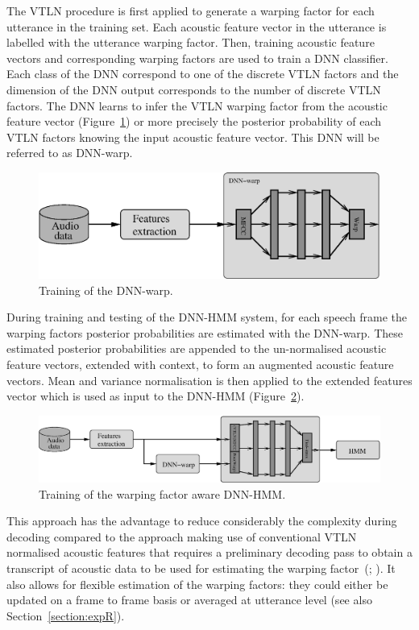 \documentclass{nle}
\begin{document}
The VTLN procedure is first applied to generate a warping factor for
each  utterance in the  training set. Each acoustic feature vector in the utterance is labelled with the utterance warping factor. Then, training acoustic feature vectors and corresponding warping factors are used to train a DNN classifier. Each class of the DNN correspond to one of the discrete VTLN factors and the dimension of the DNN output corresponds to the number of discrete VTLN factors. The DNN learns to infer the VTLN warping factor from the acoustic feature vector (Figure~\ref{fig1}) or more precisely the posterior probability of each VTLN factors knowing the input acoustic feature vector. This DNN will be referred to as DNN-warp.
\begin{figure}
       \includegraphics[width=\textwidth]{fig1}
        \caption{Training of the DNN-warp.} 
   	\label{fig1}
\end{figure}


During training  and testing  of the DNN-HMM  system, for  each speech
frame the  warping factors posterior probabilities are  estimated with
the DNN-warp. These estimated posterior probabilities are appended to
the un-normalised acoustic feature vectors, extended  with context, to
form an augmented acoustic feature vectors. Mean and variance normalisation is then applied to the extended features vector
which is used as input to the DNN-HMM (Figure~\ref{fig2}).
 \begin{figure}
       \includegraphics[width=\textwidth]{fig2}
         \caption{Training of the warping factor aware DNN-HMM.} 
    	\label{fig2}
 \end{figure}
 
This approach has the  advantage to reduce considerably the complexity
during decoding  compared to the  approach making use  of conventional
VTLN normalised acoustic features that requires a preliminary decoding
pass to obtain a transcript of acoustic data to be used for estimating
the   warping   factor~(\citealp{LeeRos96}; \citealp*{WelKanNey99}). 
It also allows for flexible estimation of the
warping  factors: they could  either be  updated on  a frame  to frame
basis     or    averaged    at     utterance    level     (see    also
Section~\ref{section:expR}).
\end{document}
